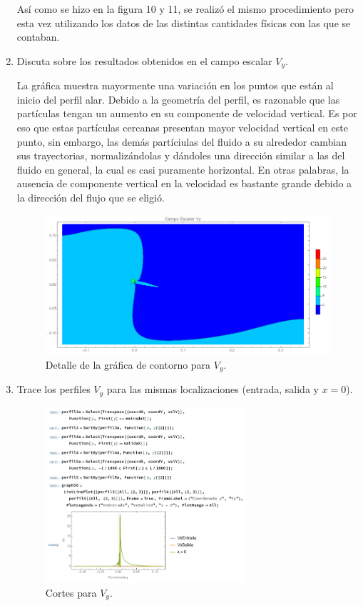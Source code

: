 \documentclass[12pt, letterpaper]{article}
\begin{document}
\begin{enumerate}
		Así como se hizo en la figura 10 y 11, se realizó el mismo procedimiento pero esta vez utilizando los datos de las distintas cantidades físicas con las que se contaban. 
	\item Discuta sobre los resultados obtenidos en el campo escalar $V_y$.

		La gráfica muestra mayormente una variación en los puntos que están al inicio del perfil alar. Debido a la geometría del perfil, es razonable que las partículas tengan un aumento en su componente de velocidad vertical. Es por eso que estas partículas cercanas presentan mayor velocidad vertical en este punto, sin embargo, las demás partíciulas del fluido a su alrededor cambian sus trayectorias, normalizándolas y dándoles una dirección similar a las del fluido en general, la cual es casi puramente horizontal. En otras palabras, la ausencia de componente vertical en la velocidad es bastante grande debido a la dirección del flujo que se eligió.
		\begin{figure}[H]
			\centering
			\includegraphics[width=\textwidth]{15.png}
			\caption{Detalle de la gráfica de contorno para $V_y$.}
		\end{figure}
	\item Trace los perfiles $V_y$ para las mismas localizaciones (entrada, salida y $x = 0$).
		
		\begin{figure}[H]
			\centering
			\includegraphics[width=0.7\textwidth]{23.png}
			\caption{Cortes para $V_y$.}
		\end{figure}


\end{enumerate}
\end{document}
